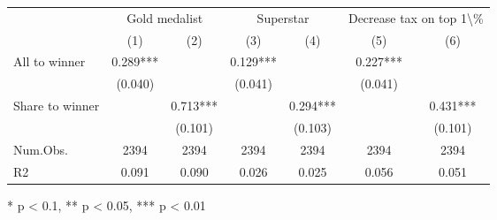 \begin{table}[t]
\fontsize{12.0pt}{14.4pt}\selectfont
\begin{tabular*}{\linewidth}{@{\extracolsep{\fill}}lcccccc}
\toprule
 & \multicolumn{2}{c}{Gold medalist} & \multicolumn{2}{c}{Superstar} & \multicolumn{2}{c}{Decrease tax on top 1\textbackslash{}\%} \\ 
\cmidrule(lr){2-3} \cmidrule(lr){4-5} \cmidrule(lr){6-7}
  & (1) & (2) & (3) & (4) & (5) & (6) \\ 
\midrule\addlinespace[2.5pt]
All to winner & 0.289*** &  & 0.129*** &  & 0.227*** &  \\ 
 & (0.040) &  & (0.041) &  & (0.041) &  \\ 
Share to winner &  & 0.713*** &  & 0.294*** &  & 0.431*** \\ 
{} & {} & {(0.101)} & {} & {(0.103)} & {} & {(0.101)} \\ 
Num.Obs. & 2394 & 2394 & 2394 & 2394 & 2394 & 2394 \\ 
R2 & 0.091 & 0.090 & 0.026 & 0.025 & 0.056 & 0.051 \\ 
\bottomrule
\end{tabular*}
\begin{minipage}{\linewidth}
* p < 0.1, ** p < 0.05, *** p < 0.01\\
\end{minipage}
\end{table}

